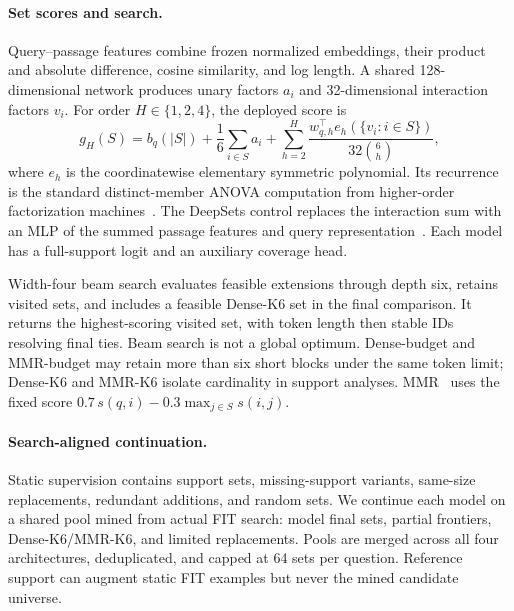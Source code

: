\documentclass[runningheads]{llncs}
\begin{document}
\paragraph{Set scores and search.}
Query--passage features combine frozen normalized embeddings, their product
and absolute difference, cosine similarity, and log length. A shared
128-dimensional network produces unary factors $a_i$ and 32-dimensional
interaction factors $v_i$. For order $H\in\{1,2,4\}$, the deployed score is
\begin{equation}\label{eq:score}
g_H(S)=b_q(|S|)+\frac1{6}\sum_{i\in S}a_i+
\sum_{h=2}^{H}\frac{w_{q,h}^{\top}e_h(\{v_i:i\in S\})}{32\binom6h},
\end{equation}
where $e_h$ is the coordinatewise elementary symmetric polynomial.
Its recurrence is the standard distinct-member ANOVA computation from
higher-order factorization machines~\cite{blondel2016hofm}.
The DeepSets control replaces the interaction sum with an MLP of the summed
passage features and query representation~\cite{zaheer2017deepsets}.
Each model has a full-support logit and an auxiliary coverage head.

Width-four beam search evaluates feasible extensions through depth six,
retains visited sets, and includes a feasible Dense-K6 set in the final
comparison. It returns the highest-scoring visited set, with token length
then stable IDs resolving final ties. Beam search is not a global optimum.
Dense-budget and MMR-budget may retain more than six short blocks under the
same token limit; Dense-K6 and MMR-K6 isolate cardinality in support analyses.
MMR~\cite{carbonell1998mmr} uses the fixed score $0.7\,s(q,i)-0.3\max_{j\in S}s(i,j)$.

\paragraph{Search-aligned continuation.}
Static supervision contains support sets, missing-support variants,
same-size replacements, redundant additions, and random sets. We continue
each model on a shared pool mined from actual FIT search: model final sets,
partial frontiers, Dense-K6/MMR-K6, and limited replacements. Pools are
merged across all four architectures, deduplicated, and capped at 64 sets
per question. Reference support can augment static FIT examples but never
the mined candidate universe.
\end{document}
